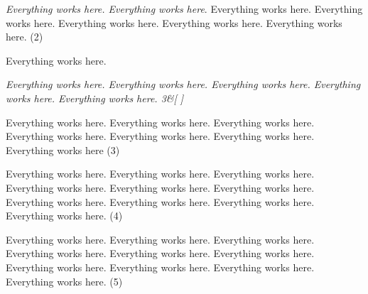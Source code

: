 \documentclass[11pt,twoside]{book}
\begin{document}
\begin{pages}
\begin{Rightside}
\textit{Everything works here. Everything works here}. Everything works here. Everything works here. Everything works here. Everything works here. Everything works here. (2)

Everything works here.

\begin{astanza}
\setlength{\rightskip}{15mm}\itshape Everything works here. Everything works here. Everything works here. Everything works here. Everything works here. 3\&[ ]
\end{astanza}

Everything works here. Everything works here. Everything works here. Everything works here. Everything works here. Everything works here. Everything works here (3)

Everything works here. Everything works here. Everything works here. Everything works here. Everything works here. Everything works here. Everything works here. Everything works here. Everything works here. Everything works here. (4)\



Everything works here. Everything works here. Everything works here. Everything works here. Everything works here. Everything works here. Everything works here. Everything works here. Everything works here. Everything works here. (5)\



    \endnumbering
        \end{Rightside}

\end{pages}
\Pages
\end{document}
